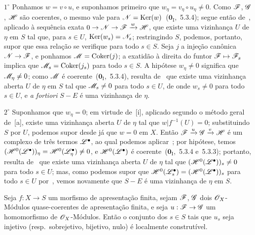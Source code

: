$1^\circ$ Ponhamos $w=v\circ u$, e suponhamos primeiro que $w_\eta=v_\eta\circ u_\eta\neq 0$.
Como $\mathscr{F}$, $\mathscr{G}$, $\mathscr{H}$ são coerentes, o mesmo vale para $\mathscr{N}=\operatorname{Ker}(w)$~($\mathbf{0}_{\mathrm{I}}$,~5.3.4); segue então de~, aplicado à sequência exata $0\to\sh{N}\to\sh{F}\xrightarrow{w}\sh{H}$, que existe uma vizinhança $U$ de $\eta$ em $S$ tal que, para $s\in U$, $\operatorname{Ker}(w_s)=\mathscr{N}_s$; restringindo $S$, podemos, portanto, supor que essa relação se verifique para todo $s\in S$.
Seja $j$ a injeção canônica $\sh{N}\to\sh{F}$, e ponhamos $\mathscr{M}=\operatorname{Coker}(j)$; a exatidão à direita do funtor $\sh{F}\mapsto\sh{F}_s$ implica que $\mathscr{M}_s=\operatorname{Coker}(j_s)$ para todo $s\in S$.
A hipótese $w_\eta\neq 0$ significa que $\mathscr{M}_\eta\neq 0$; como $\mathscr{M}$ é coerente~($\mathbf{0}_{\mathrm{I}}$,~5.3.4), resulta de~ que existe uma vizinhança aberta $U$ de $\eta$ em $S$ tal que $\mathscr{M}_s\neq 0$ para todo $s\in U$, de onde $w_s\neq 0$ para todo $s\in U$, e \emph{a fortiori} $S-E$ é uma vizinhança de $\eta$.

$2^\circ$ Suponhamos que $w_\eta=0$; em virtude de~[i], aplicado segundo o método geral de~[a], existe uma vizinhança aberta $U$ de $\eta$ tal que $w|f^{-1}(U)=0$; substituindo $S$ por $U$, podemos supor desde já que $w=0$ em $X$.
Então $\mathscr{F}\xrightarrow{u}\mathscr{G}\xrightarrow{v}\mathscr{H}$ é um complexo de três termos $\mathscr{L}^\bullet$, ao qual podemos aplicar~; por hipótese, temos $(\mathscr{H}^0(\mathscr{L}^\bullet))_\eta=\mathscr{H}^0(\mathscr{L}^\bullet_\eta)\neq 0$, e $\mathscr{H}^0(\mathscr{L}^\bullet)$ é coerente~($\mathbf{0}_{\mathrm{I}}$,~5.3.4 e~5.3.3); portanto, resulta de~ que existe uma vizinhança aberta $U$ de $\eta$ tal que $(\mathscr{H}^0(\mathscr{L}^\bullet))_s\neq 0$ para todo $s\in U$; mas, como podemos supor que $\mathscr{H}^0(\mathscr{L}^\bullet_s)=(\mathscr{H}^0(\mathscr{L}^\bullet))_s$ para todo $s\in U$ por~, vemos novamente que $S-E$ é uma vizinhança de $\eta$ em $S$.


\begin{corollary}[9.4.5]
\label{IV.9.4.5}
Seja $f:X\to S$ um morfismo de apresentação finita, sejam $\mathscr{F}$, $\mathscr{G}$ dois $\mathscr{O}_X$-Módulos quase-coerentes de apresentação finita, e seja $u:\sh{F}\to\sh{G}$ um homomorfismo de $\mathscr{O}_X$-Módulos.
Então o conjunto dos $s\in S$ tais que $u_s$ seja injetivo \textnormal{(}resp.\ sobrejetivo, bijetivo, nulo\textnormal{)} é localmente construtível.
\end{corollary}

